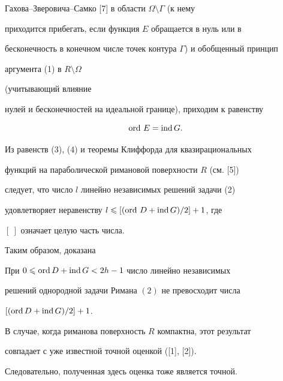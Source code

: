 Гахова--Зверовича--Самко [7] в области $\Omega\setminus\Gamma$ (к нему


приходится прибегать, если функция $E$ обращается в нуль или в


бесконечность в  конечном числе точек контура $\Gamma$) и обобщенный принцип


аргумента (1) в  $R\setminus\Omega$


(учитывающий влияние


нулей и бесконечностей на идеальной границе), приходим к равенству


\begin{equation}


\ord\,E=\ind G.


\end{equation}





Из равенств (3), (4) и теоремы Клиффорда для квазирациональных


функций на параболической римановой поверхности $R$ (см. [5])


следует, что число $l$ линейно независимых решений задачи (2)


удовлетворяет неравенству $l\leqslant [(\operatorname{ord}\,D + \operatorname{ind} G)/2]+1$, где


$[\ ]$ означает целую часть числа.





Таким образом, доказана





\begin{thmnonum}


При $0\leqslant\operatorname{ord} D+\operatorname{ind} G<2h-1$ число  линейно независимых


решений однородной задачи Римана $(2)$ не превосходит числа


$[(\operatorname{ord} D+\operatorname{ind} G)/2]+1$.


\end{thmnonum}





В случае, когда риманова поверхность $R$ компактна, этот результат


совпадает с уже известной точной оценкой ([1], [2]).


Следовательно, полученная здесь оценка тоже является точной.








